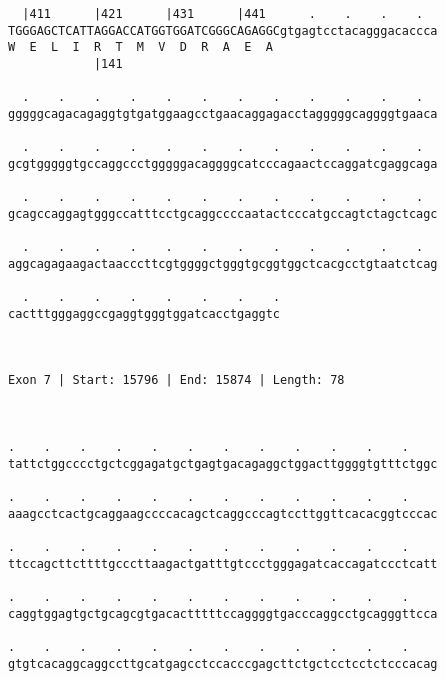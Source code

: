 \documentclass{article}
\begin{document}
\begin{Verbatim}
  |411      |421      |431      |441      .    .    .    .  
TGGGAGCTCATTAGGACCATGGTGGATCGGGCAGAGGCgtgagtcctacagggacaccca
W  E  L  I  R  T  M  V  D  R  A  E  A                       
            |141                                            
  
  .    .    .    .    .    .    .    .    .    .    .    .  
gggggcagacagaggtgtgatggaagcctgaacaggagacctagggggcaggggtgaaca
                                                            
  .    .    .    .    .    .    .    .    .    .    .    .  
gcgtgggggtgccaggccctgggggacaggggcatcccagaactccaggatcgaggcaga
                                                            
  .    .    .    .    .    .    .    .    .    .    .    .  
gcagccaggagtgggccatttcctgcaggccccaatactcccatgccagtctagctcagc
                                                            
  .    .    .    .    .    .    .    .    .    .    .    .  
aggcagagaagactaacccttcgtggggctgggtgcggtggctcacgcctgtaatctcag
                                                            
  .    .    .    .    .    .    .    .
cactttgggaggccgaggtgggtggatcacctgaggtc
                                      
                                      
 
Exon 7 | Start: 15796 | End: 15874 | Length: 78



.    .    .    .    .    .    .    .    .    .    .    .    
tattctggcccctgctcggagatgctgagtgacagaggctggacttggggtgtttctggc
                                                            
.    .    .    .    .    .    .    .    .    .    .    .    
aaagcctcactgcaggaagccccacagctcaggcccagtccttggttcacacggtcccac
                                                            
.    .    .    .    .    .    .    .    .    .    .    .    
ttccagcttcttttgcccttaagactgatttgtccctgggagatcaccagatccctcatt
                                                            
.    .    .    .    .    .    .    .    .    .    .    .    
caggtggagtgctgcagcgtgacactttttccaggggtgacccaggcctgcagggttcca
                                                            
.    .    .    .    .    .    .    .    .    .    .    .    
gtgtcacaggcaggccttgcatgagcctccacccgagcttctgctcctcctctcccacag
                                                            

\end{Verbatim}
\end{document}
